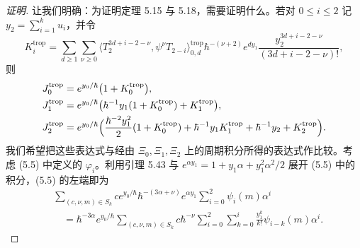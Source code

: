 \begin{proof}[证明]
让我们明确：为证明定理 5.15 与 5.18，需要证明什么。若对 $0\le i\le 2$ 记 $y_2=\sum_{i=1}^{k}u_i$，并令
\[
  K_i^{\mathrm{trop}}=\sum_{d\ge 1}\sum_{\nu\ge 0}\langle T_2^{3d+i-2-\nu},\psi^\nu T_{2-i}\rangle_{0,d}^{\mathrm{trop}}\hbar^{-(\nu+2)}e^{dy_1}
  \frac{y_2^{3d+i-2-\nu}}{(3d+i-2-\nu)!},
\]
则
\begin{align*}
  J_0^{\mathrm{trop}}&=e^{y_0/\hbar}\bigl(1+K_0^{\mathrm{trop}}\bigr),\\
  J_1^{\mathrm{trop}}&=e^{y_0/\hbar}\bigl(\hbar^{-1}y_1(1+K_0^{\mathrm{trop}})+K_1^{\mathrm{trop}}\bigr),\\
  J_2^{\mathrm{trop}}&=e^{y_0/\hbar}\Bigl(\frac{\hbar^{-2}y_1^2}{2}(1+K_0^{\mathrm{trop}})+\hbar^{-1}y_1K_1^{\mathrm{trop}}+\hbar^{-1}y_2+K_2^{\mathrm{trop}}\Bigr).
\end{align*}
我们希望把这些表达式与经由 $\Xi_0,\Xi_1,\Xi_2$ 上的周期积分所得的表达式作比较。考虑 (5.5) 中定义的 $\varphi_i$。利用引理 5.43 与 $e^{\alpha y_1}=1+y_1\alpha+y_1^2\alpha^2/2$ 展开 (5.5) 中的积分，(5.5) 的左端即为
\begin{align*}
  &\sum_{(c,\nu,m)\in S_k}ce^{y_0/\hbar}\hbar^{-(3\alpha+\nu)}e^{\alpha y_1}\sum_{i=0}^2\psi_i(m)\alpha^i\\
  &\quad =\hbar^{-3\alpha}e^{y_0/\hbar}\sum_{(c,\nu,m)\in S_k}c\hbar^{-\nu}\sum_{i=0}^2\sum_{k=0}^{i}\frac{y_1^k}{k!}\psi_{i-k}(m)\alpha^i.
\end{align*}


\end{proof}

